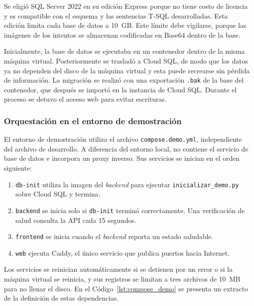 Se eligió SQL Server 2022 en su edición Express porque no tiene costo de licencia y es compatible con el esquema y las sentencias T-SQL desarrolladas. Esta edición limita cada base de datos a 10~GB. Este límite debe vigilarse, porque las imágenes de los intentos se almacenan codificadas en Base64 dentro de la base.

Inicialmente, la base de datos se ejecutaba en un contenedor dentro de la misma máquina virtual. Posteriormente se trasladó a Cloud SQL, de modo que los datos ya no dependen del disco de la máquina virtual y esta puede recrearse sin pérdida de información. La migración se realizó con una exportación \texttt{.bak} de la base del contenedor, que después se importó en la instancia de Cloud SQL. Durante el proceso se detuvo el acceso web para evitar escrituras.


\subsubsection{Orquestación en el entorno de demostración}

El entorno de demostración utiliza el archivo \texttt{compose.demo.yml}, independiente del archivo de desarrollo. A diferencia del entorno local, no contiene el servicio de base de datos e incorpora un proxy inverso. Sus servicios se inician en el orden siguiente:

\begin{enumerate}
    \item \texttt{db-init} utiliza la imagen del \textit{backend} para ejecutar \texttt{inicializar\_demo.py} sobre Cloud SQL y termina.
    \item \texttt{backend} se inicia solo si \texttt{db-init} terminó correctamente. Una verificación de salud consulta la API cada 15 segundos.
    \item \texttt{frontend} se inicia cuando el \textit{backend} reporta un estado saludable.
    \item \texttt{web} ejecuta Caddy, el único servicio que publica puertos hacia Internet.
\end{enumerate}

Los servicios se reinician automáticamente si se detienen por un error o si la máquina virtual se reinicia, y sus registros se limitan a tres archivos de 10~MB para no llenar el disco. En el Código~\ref{lst:compose_demo} se presenta un extracto de la definición de estas dependencias.

